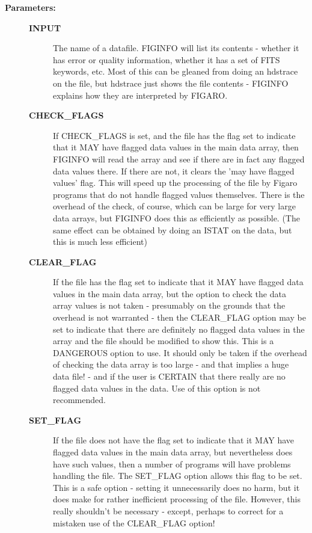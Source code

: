 \begin{description}
\begin{description}
\item [\textbf{Parameters:}]
\begin{description}
\item [\textbf{INPUT}]
 The name of a datafile.
 FIGINFO will list its contents - whether it has error or
 quality information, whether it has a set of FITS keywords,
 etc. Most of this can be gleaned from doing an hdstrace on
 the file, but hdstrace just shows the file contents -
 FIGINFO explains how they are interpreted by FIGARO.
\item [\textbf{CHECK\_FLAGS}]
 If CHECK\_FLAGS is set, and the file has the flag set to
 indicate that it MAY have flagged data values in the main
 data array, then FIGINFO will read the array and see if
 there are in fact any flagged data values there. If there
 are not, it clears the 'may have flagged values' flag.
 This will speed up the processing of the file by Figaro
 programs that do not handle flagged values themselves. There
 is the overhead of the check, of course, which can be large
 for very large data arrays, but FIGINFO does this as
 efficiently as possible. (The same effect can be obtained by
 doing an ISTAT on the data, but this is much less efficient)
\item [\textbf{CLEAR\_FLAG}]
 If the file has the flag set to indicate that it MAY have
 flagged data values in the main data array, but the option
 to check the data array values is not taken - presumably on
 the grounds that the overhead is not warranted - then the
 CLEAR\_FLAG option may be set to indicate that there
 are definitely no flagged data values in the array and the
 file should be modified to show this. This is a DANGEROUS
 option to use. It should only be taken if the overhead of
 checking the data array is too large - and that implies a
 huge data file! - and if the user is CERTAIN that there
 really are no flagged data values in the data. Use of this
 option is not recommended.
\item [\textbf{SET\_FLAG}]
 If the file does not have the flag set to indicate that it
 MAY have flagged data values in the main data array, but
 nevertheless does have such values, then a number of programs
 will have problems handling the file. The SET\_FLAG option
 allows this flag to be set. This is a safe option - setting
 it unnecessarily does no harm, but it does make for rather
 inefficient processing of the file. However, this really
 shouldn't be necessary - except, perhaps to correct for a
 mistaken use of the CLEAR\_FLAG option!
\end{description}


\end{description}
\end{description}
